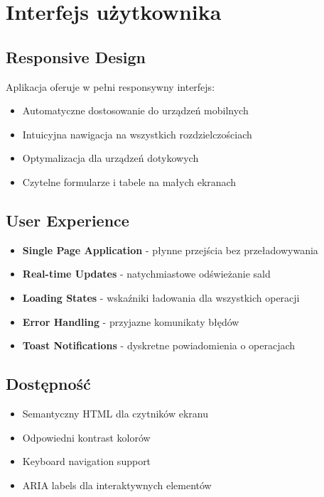\documentclass[12pt,a4paper]{article}
\begin{document}
    \section{Interfejs użytkownika}

    \subsection{Responsive Design}
    Aplikacja oferuje w pełni responsywny interfejs:
    \begin{itemize}
        \item Automatyczne dostosowanie do urządzeń mobilnych
        \item Intuicyjna nawigacja na wszystkich rozdzielczościach
        \item Optymalizacja dla urządzeń dotykowych
        \item Czytelne formularze i tabele na małych ekranach
    \end{itemize}

    \subsection{User Experience}
    \begin{itemize}
        \item \textbf{Single Page Application} - płynne przejścia bez przeładowywania
        \item \textbf{Real-time Updates} - natychmiastowe odświeżanie sald
        \item \textbf{Loading States} - wskaźniki ładowania dla wszystkich operacji
        \item \textbf{Error Handling} - przyjazne komunikaty błędów
        \item \textbf{Toast Notifications} - dyskretne powiadomienia o operacjach
    \end{itemize}

    \subsection{Dostępność}
    \begin{itemize}
        \item Semantyczny HTML dla czytników ekranu
        \item Odpowiedni kontrast kolorów
        \item Keyboard navigation support
        \item ARIA labels dla interaktywnych elementów
    \end{itemize}
\end{document}
